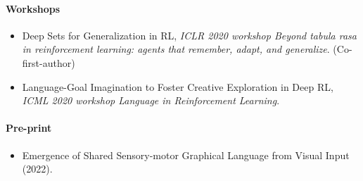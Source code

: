 \paragraph{Workshops}

\begin{itemize}
	\item Deep Sets for Generalization in RL, \textit{ICLR 2020 workshop Beyond tabula rasa in reinforcement learning: agents that remember, adapt, and generalize}. \cite{karch2020deepset} (Co-first-author)
	\item Language-Goal Imagination to Foster Creative Exploration in Deep RL, \textit{ICML 2020 workshop Language in Reinforcement Learning}. 
\end{itemize}

\paragraph{Pre-print}

\begin{itemize}
	\item Emergence of Shared Sensory-motor Graphical Language from Visual Input (2022).
\end{itemize}


